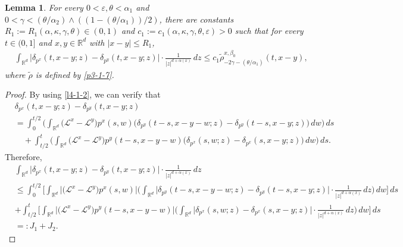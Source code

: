 \documentclass[a4paper,11pt]{amsart}
\renewcommand{\le}{\leqslant}
\newcommand{\R}{\mathds R}
\newcommand{\B}{\beta}
\newcommand{\T}{\theta}
\newcommand{\K}{\kappa}
\newcommand{\A}{\alpha}
\newcommand{\G}{\gamma}
\newcommand{\e}{ \varepsilon}
\def\LL{{\mathcal L}}
\newtheorem{lemma}[theorem]{Lemma}
\theoremstyle{definition}
\begin{document}
\begin{lemma}\label{l4-2}
For every $0<\varepsilon, \theta<\A_1$ and $0<\gamma<({\theta}/{\A_2})\wedge ((1-({\theta}/{\A_1}))/2)$, there are constants $R_1:=R_1(\A,\K,\G,\T)\in (0,1)$ and $c_1:=c_1(\A,\K,\G,\T,\e)>0$ such that
for every $t \in (0,1]$ and $x,y\in \R^d$ with $|x-y|\le R_1$,
\begin{equation}\label{l4-2-1}
\begin{split}
&\int_{\R^d}\big|\delta_{p^x}(t,x-y;z)-\delta_{p^y}(t,x-y;z)\big|\cdot\frac{1}{|z|^{d+\A(x)}}\,dz
\le c_1\tilde \rho^{x,\B_0}_{-2\G-({\T}/{\A_1})}(t,x-y),
\end{split}
\end{equation}
where $\tilde \rho$ is defined by \eqref{p3-1-7}.
\end{lemma}
\begin{proof}
By using \eqref{l4-1-2}, we can verify that
\begin{align*}
& \delta_{p^x}(t,x-y;z)-\delta_{p^y}(t,x-y;z)\\
&=\int_0^{{t}/{2}}\bigg(\int_{\R^d}\big( \LL^x- \LL^y\big)p^x(s,w)
\big(\delta_{p^y}(t-s,x-y-w;z)-\delta_{p^y}(t-s,x-y;z)\big)\,dw\bigg)\,ds\\
&\quad+\int_{{t}/{2}}^t\!\!\bigg(\int_{\R^d}\big( \LL^x- \LL^y\big)p^y(t-s,x-y-w)
\big(\delta_{p^x}(s,w;z)-\delta_{p^x}(s,x-y;z)\big)\,dw\bigg)\,ds.
\end{align*}
Therefore,
\begin{align*}
& \int_{\R^d}\big|\delta_{p^x}(t,x-y;z)-\delta_{p^y}(t,x-y;z)\big|\cdot\frac{1}{|z|^{d+\A(x)}}\,dz\\
& \le \int_0^{{t}/{2}}\bigg[\int_{\R^d}\big|\big( \LL^x- \LL^y\big)p^x(s,w)\big|
\bigg(\int_{\R^d}\big|\delta_{p^y}(t-s,x-y-w;z)-\delta_{p^y}(t-s,x-y;z)\big|\cdot \frac{1}{|z|^{d+\A(x)}}\,dz\bigg)\,dw\bigg]\,ds\\
&+\int_{{t}/{2}}^t\bigg[\int_{\R^d}\big|\big( \LL^x- \LL^y\big)p^y(t-s,x-y-w)\big|
\bigg(\int_{\R^d}\big|\delta_{p^x}(s,w;z)-\delta_{p^x}(s,x-y;z)\big|\cdot \frac{1}{|z|^{d+\A(x)}}\,dz\bigg)\,dw\bigg]\,ds\\
&=:J_1+J_2.
\end{align*}



\end{proof}
\end{document}
